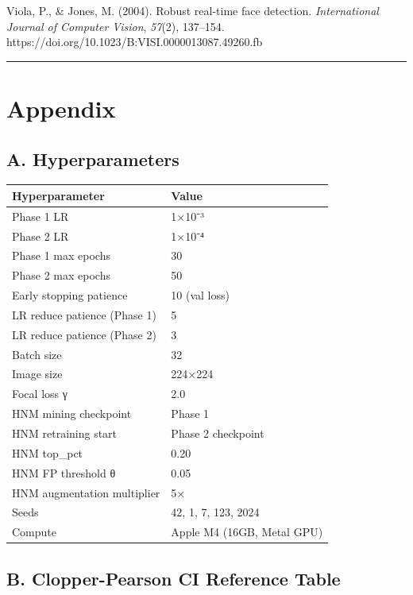 \documentclass[
  11pt,
]{article}
\newcounter{none} %
\begin{document}
Viola, P., \& Jones, M. (2004). Robust real-time face detection.
\emph{International Journal of Computer Vision}, \emph{57}(2), 137--154.
https://doi.org/10.1023/B:VISI.0000013087.49260.fb

\begin{center}\rule{0.5\linewidth}{0.5pt}\end{center}

\section{Appendix}\label{appendix}

\subsection{A. Hyperparameters}\label{a.-hyperparameters}

{\def\LTcaptype{none} %
\begin{longtable}[]{@{}ll@{}}
\toprule\noalign{}
Hyperparameter & Value \\
\midrule\noalign{}
\endhead
\bottomrule\noalign{}
\endlastfoot
Phase 1 LR & 1×10⁻³ \\
Phase 2 LR & 1×10⁻⁴ \\
Phase 1 max epochs & 30 \\
Phase 2 max epochs & 50 \\
Early stopping patience & 10 (val loss) \\
LR reduce patience (Phase 1) & 5 \\
LR reduce patience (Phase 2) & 3 \\
Batch size & 32 \\
Image size & 224×224 \\
Focal loss γ & 2.0 \\
HNM mining checkpoint & Phase 1 \\
HNM retraining start & Phase 2 checkpoint \\
HNM top\_pct & 0.20 \\
HNM FP threshold θ & 0.05 \\
HNM augmentation multiplier & 5× \\
Seeds & 42, 1, 7, 123, 2024 \\
Compute & Apple M4 (16GB, Metal GPU) \\
\end{longtable}
}

\subsection{B. Clopper-Pearson CI Reference
Table}\label{b.-clopper-pearson-ci-reference-table}
\end{document}
